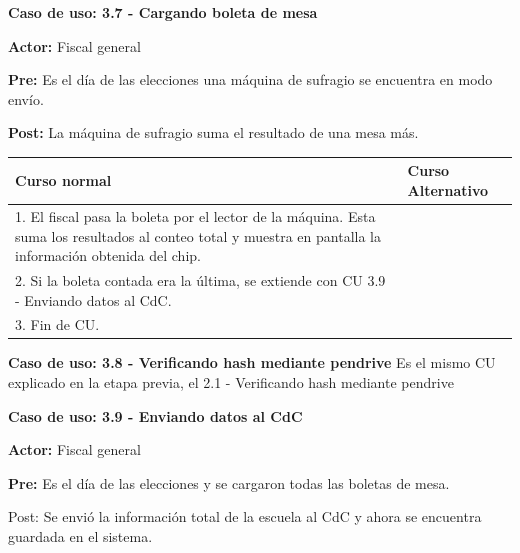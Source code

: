 \textbf{Caso de uso: 3.7 - Cargando boleta de mesa}

\textbf{Actor:} Fiscal general

\textbf{Pre:} Es el día de las elecciones una máquina de sufragio se encuentra en modo envío.

\textbf{Post:} La máquina de sufragio suma el resultado de una mesa más.

\begin{table}[h!]
	
 \begin{tabular}{|p{7.5cm} | p{7.5cm}|} 
 \hline
 \textbf{Curso normal} & \textbf{Curso Alternativo} \\
 \hline

1. El fiscal pasa la boleta por el lector de la máquina. Esta suma los resultados al conteo total y muestra en pantalla la información obtenida del chip. & \\
\hline

2. Si la boleta contada era la última, se extiende con CU 3.9 - Enviando datos al CdC. & \\
\hline

3. Fin de CU. & \\
\hline
\end{tabular}
\end{table}

\textbf{Caso de uso: 3.8 - Verificando hash mediante pendrive}
Es el mismo CU explicado en la etapa previa, el 2.1 - Verificando hash mediante pendrive

\textbf{Caso de uso: 3.9 - Enviando datos al CdC}

\textbf{Actor: }Fiscal general

\textbf{Pre:} Es el día de las elecciones y se cargaron todas las boletas de mesa.

Post: Se envió la información total de la escuela al CdC y ahora se encuentra guardada en el sistema.

